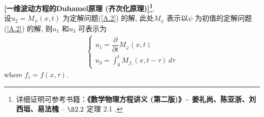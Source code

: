 	\newpage
	
	\begin{thm}\label{thm A.3.1}
		\textbf{[一维波动方程的Duhamel原理 (齐次化原理)]\footnote{详细证明可参考书籍：\textbf{《数学物理方程讲义 (第二版)》--  姜礼尚、陈亚浙、刘西垣、易法槐} -- $\S 2.2$ 定理 2.1 .}}. \\
		设$u_2 = M_{\psi}(x , t)$ 为定解问题(\ref{A.2}) 的解, 此处$M_\psi$ 表示以$\psi$ 为初值的定解问题(\ref{A.2}) 的解, 则$u_1$ 和$u_3$ 可表示为
		\begin{align*}
			\begin{cases}
				u_1 = \dfrac{\partial}{\partial t} M_{\varphi}(x , t) \\
				u_3 = \int_{0}^t M_{f_{\tau}} (x , t - \tau) \, d\tau
			\end{cases}
		\end{align*}
		where $f_{\tau} = f(x , \tau)$.
	\end{thm}

\newpage

